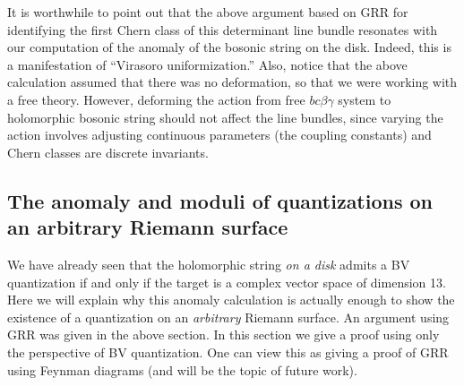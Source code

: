 It is worthwhile to point out that the above argument based on GRR for identifying the first Chern class of this determinant line bundle resonates with our computation of the anomaly of the bosonic string on the disk. Indeed, this is a manifestation of ``Virasoro uniformization.'' 
Also, notice that the above calculation assumed that there was no deformation, so that we were working with a free theory. 
However, deforming the action from free $bc\beta\gamma$ system to holomorphic bosonic string should not affect the line bundles, 
since varying the action involves adjusting continuous parameters (the coupling constants) and Chern classes are discrete invariants.

\subsection{The anomaly and moduli of quantizations on an arbitrary Riemann surface}

We have already seen that the holomorphic string {\it on a disk} admits a BV quantization if and only if the target is a complex vector space of dimension 13.
Here we will explain why this anomaly calculation is actually enough to show the existence of a quantization on an {\it arbitrary} Riemann surface. 
An argument using GRR was given in the above section. 
In this section we give a proof using only the perspective of BV quantization.
One can view this as giving a proof of GRR using Feynman diagrams (and will be the topic of future work). 

